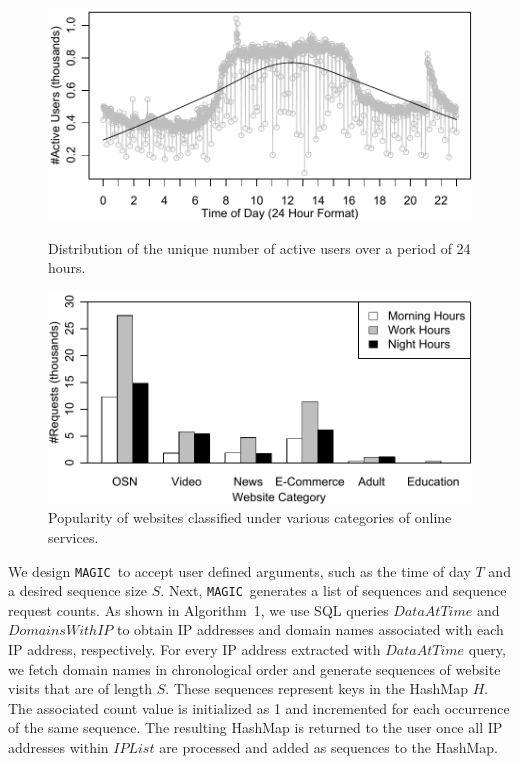 \documentclass[letterpaper,twocolumn]{article}
\newcommand{\sol}{\texttt{MAGIC}}
\begin{document}
    \begin{figure}[t]
\centering
\includegraphics[width=\linewidth]{img/active_users_over_time}
  \vspace{-15pt}
\caption{Distribution of the unique number of active users over a period of 24 hours.}
 \label{fig:active_users}
  \endminipage
  \hfill
\includegraphics[width=\linewidth]{img/popularity}
  \vspace{-15pt}
\caption{Popularity of websites classified under various categories of online services.}
 \label{fig:popularity_per_hour}
  \endminipage
  \vspace{-18pt}
 \end{figure}

We design \sol\ to accept user defined arguments, such as the time of day $T$ and a desired sequence size $S$.
Next, \sol\ generates a list of sequences and sequence request counts.
As shown in Algorithm~1, we use SQL queries $DataAtTime$ and $DomainsWithIP$ to obtain IP addresses and domain names associated with each IP address, respectively. 
For every IP address extracted with $DataAtTime$ query, we fetch domain names in chronological order and generate sequences of website visits that are of length $S$. 
These sequences represent keys in the HashMap $H$.
The associated count value is initialized as 1 and incremented for each occurrence of the same sequence.
The resulting HashMap is returned to the user once all IP addresses within $IPList$ are processed and added as sequences to the HashMap.
\end{document}
